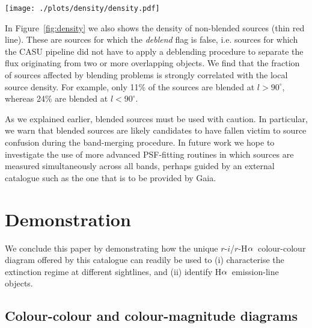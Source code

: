 \documentclass[useAMS,usenatbib]{mn2e}
\def\ha{\mbox{H$\rm \alpha$}}
\begin{document}
\begin{figure*}
    \texttt{[image: ./plots/density/density.pdf]} 
    \caption{Mean number density of sources in the catalogue 
    as a function of Galactic longitude, 
    with and without blended sources included. 
    The densities shown were computed by counting the sources 
    at each longitude between $-5^\circ<b<+5^\circ$ (upper blue line).
    We also show the densities based on only counting those sources 
    for which the \emph{deblend} flag is {\sc false}, 
    i.e. unconfused sources for which the CASU pipeline did not have to apply 
    a deblending procedure (lower red line). 
    }
    \label{fig:density}
\end{figure*}

In Figure~\ref{fig:density} we also shows the density
of non-blended sources (thin red line).
These are sources for which the \emph{deblend} flag is {\sc false},
i.e. sources for which the CASU pipeline did not have to apply 
a deblending procedure to separate the flux
originating from two or more overlapping objects.
We find that the fraction of sources affected by blending problems
is strongly correlated with the local source density.
For example, only 11\% of the sources are blended
at $l>90^\circ$, whereas 24\% are blended at $l<90^\circ$.

As we explained earlier, blended sources must be used with caution.
In particular, we warn that blended sources
are likely candidates to have fallen victim
to source confusion during the band-merging procedure.
In future work we hope to investigate the use of
more advanced PSF-fitting routines
in which sources are measured simultaneously across all bands,
perhaps guided by an external catalogue such as the one
that is to be provided by Gaia.

\section{Demonstration}
\label{sec:demonstration}

We conclude this paper by demonstrating how the unique
$r$-$i$/$r$-\ha\ colour-colour diagram offered by this catalogue
can readily be used to
(i) characterise the extinction regime at different sightlines, and
(ii) identify \ha\ emission-line objects.

\subsection{Colour-colour and colour-magnitude diagrams}
\end{document}

